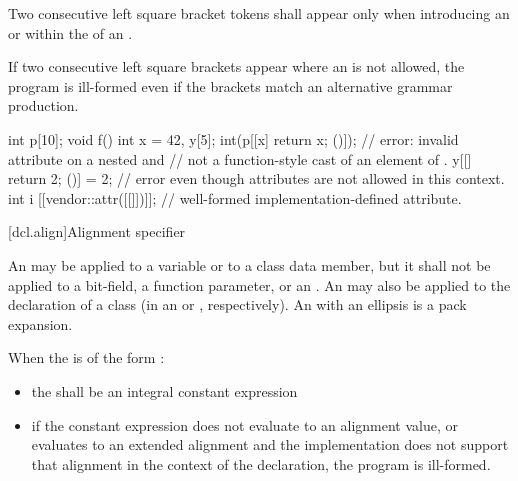 \pnum
Two consecutive left square bracket tokens shall appear only
when introducing an  or
within the  of
an .
\begin{note}
If two consecutive left square brackets appear
where an  is not allowed, the program is ill-formed even
if the brackets match an alternative grammar production.
\end{note}
\begin{example}
\begin{codeblock}
int p[10];
void f() {
  int x = 42, y[5];
  int(p[[x] { return x; }()]);  // error: invalid attribute on a nested  and
                                // not a function-style cast of an element of .
  y[[] { return 2; }()] = 2;    // error even though attributes are not allowed in this context.
  int i [[vendor::attr([[]])]]; // well-formed implementation-defined attribute.
}
\end{codeblock}
\end{example}

[dcl.align]{Alignment specifier}%

\pnum
An 
may be applied to a variable
or to a class data member, but it shall not be applied to a bit-field, a function
parameter, or an .
An  may also be applied to the declaration
of a class (in an
 or
, respectively).
An  with an ellipsis is a pack expansion.

\pnum
When the  is of the form
  \tcode{)}:
\begin{itemize}
\item the  shall be an integral constant expression

\item if the constant expression does not evaluate to an alignment
value, or evaluates to an extended alignment and
the implementation does not support that alignment in the context of the
declaration, the program is ill-formed.
\end{itemize}

